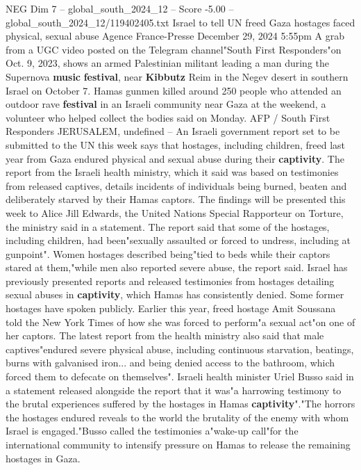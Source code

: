 \begin{textsample}{NEG Dim 7 – global\_south\_2024\_12 – Score -5.00 – global\_south\_2024\_12/119402405.txt}  \label{ex:f7_neg_294}
Israel to tell UN freed Gaza hostages faced physical, sexual abuse Agence France-Presse December 29, 2024 5:55pm A grab from a UGC video posted on the Telegram channel"South First Responders"on Oct. 9, 2023, shows an armed Palestinian militant leading a man during the Supernova \textbf{music} \textbf{festival}, near \textbf{Kibbutz} Reim in the Negev desert in southern Israel on October 7.
Hamas gunmen killed around 250 people who attended an outdoor rave \textbf{festival} in an Israeli community near Gaza at the weekend, a volunteer who helped collect the bodies said on Monday.
AFP / South First Responders JERUSALEM, undefined -- An Israeli government report set to be submitted to the UN this week says that hostages, including children, freed last year from Gaza endured physical and sexual abuse during their \textbf{captivity}.
The report from the Israeli health ministry, which it said was based on testimonies from released captives, details incidents of individuals being burned, beaten and deliberately starved by their Hamas captors.
The findings will be presented this week to Alice Jill Edwards, the United Nations Special Rapporteur on Torture, the ministry said in a statement.
The report said that some of the hostages, including children, had been"sexually assaulted or forced to undress, including at gunpoint".
Women hostages described being"tied to beds while their captors stared at them,"while men also reported severe abuse, the report said.
Israel has previously presented reports and released testimonies from hostages detailing sexual abuses in \textbf{captivity}, which Hamas has consistently denied.
Some former hostages have spoken publicly.
Earlier this year, freed hostage Amit Soussana told the New York Times of how she was forced to perform"a sexual act"on one of her captors.
The latest report from the health ministry also said that male captives"endured severe physical abuse, including continuous starvation, beatings, burns with galvanised iron... and being denied access to the bathroom, which forced them to defecate on themselves".
Israeli health minister Uriel Busso said in a statement released alongside the report that it was"a harrowing testimony to the brutal experiences suffered by the hostages in Hamas \textbf{captivity}"."The horrors the hostages endured reveals to the world the brutality of the enemy with whom Israel is engaged."Busso called the testimonies a"wake-up call"for the international community to intensify pressure on Hamas to release the remaining hostages in Gaza.

\end{textsample}
